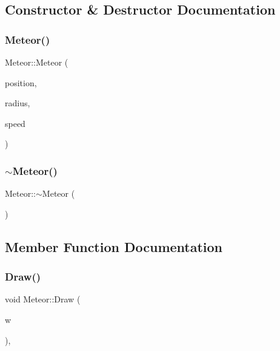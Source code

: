 \subsection{Constructor \& Destructor Documentation}
\hypertarget{class_meteor_ac3d2e6e2ed8395a62173117f283c0770}{}\label{class_meteor_ac3d2e6e2ed8395a62173117f283c0770} 
\subsubsection{\texorpdfstring{Meteor()}{Meteor()}}
{\footnotesize\ttfamily Meteor\+::\+Meteor (\begin{DoxyParamCaption}\item[{\hyperlink{class_vector2_d}{Vector2D}}]{position,  }\item[{float}]{radius,  }\item[{float}]{speed }\end{DoxyParamCaption})}

\hypertarget{class_meteor_aa4bfbce9a06fa010a5ef5213772efad8}{}\label{class_meteor_aa4bfbce9a06fa010a5ef5213772efad8} 
\subsubsection{\texorpdfstring{$\sim$\+Meteor()}{~Meteor()}}
{\footnotesize\ttfamily Meteor\+::$\sim$\+Meteor (\begin{DoxyParamCaption}{ }\end{DoxyParamCaption})}



\subsection{Member Function Documentation}
\hypertarget{class_meteor_a426244847c2446f36016c4b06713ce10}{}\label{class_meteor_a426244847c2446f36016c4b06713ce10} 
\subsubsection{\texorpdfstring{Draw()}{Draw()}}
{\footnotesize\ttfamily void Meteor\+::\+Draw (\begin{DoxyParamCaption}\item[{sf\+::\+Render\+Window \&}]{w }\end{DoxyParamCaption})\hspace{0.3cm}{\ttfamily [override]}, {\ttfamily [virtual]}}



